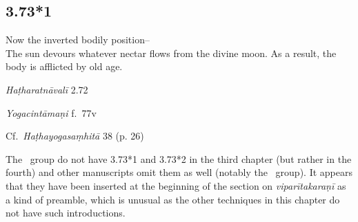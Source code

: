 \begin{ekdosis}
\subsection*{3.73*1}
\begin{translation}[hp03_073_1]
Now the inverted bodily position–\\
The sun devours whatever nectar flows from the divine moon. As a result, the body is afflicted by old age.
\end{translation}


\begin{testimonia}[hp03_073_1]
\emph{Haṭharatnāvalī} 2.72 
\begin{versinnote}
\end{versinnote}
 
\emph{Yogacintāmaṇi} f.~77v
\begin{versinnote}
\end{versinnote}

Cf.~\emph{Haṭhayogasaṃhitā} 38 (p. 26)
\begin{versinnote}
\end{versinnote}
\end{testimonia}

\begin{philcomm}[hp03_073_1]
The \textalpha\ group do not have 3.73*1 and 3.73*2 in the third chapter (but rather in the fourth) and other manuscripts omit them as well (notably the \texteta\ group). It appears that they have been inserted at the beginning of the section on \emph{viparītakaraṇī} as a kind of preamble, which is unusual as the other techniques in this chapter do not have such introductions.


\end{philcomm}
\end{ekdosis}
